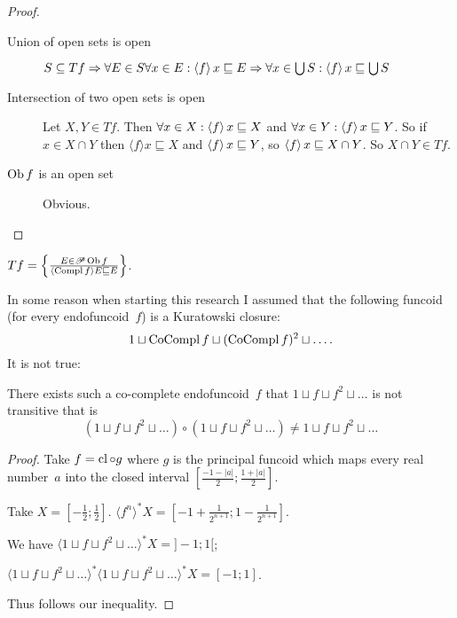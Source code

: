 \begin{proof}
  
  \begin{description}
    \item[Union of open sets is open] $S \subseteq T f \Rightarrow \forall E
    \in S \forall x \in E : \left\langle f\right\rangle x \sqsubseteq E \Rightarrow
    \forall x \in \bigcup S : \left\langle f\right\rangle x \sqsubseteq \bigcup S$
    
    \item[Intersection of two open sets is open] Let $X, Y \in T f$. Then
    $\forall x \in X : \left\langle f\right\rangle x \sqsubseteq X$ and $\forall x \in Y
    : \left\langle f\right\rangle x \sqsubseteq Y$. So if $x \in X \cap Y$ then $\langle
    f \rangle x \sqsubseteq X$ and $\left\langle f\right\rangle x \sqsubseteq Y$, so
    $\left\langle f\right\rangle x \sqsubseteq X \cap Y$. So $X \cap Y \in T f$.
    
    \item[$\operatorname{Ob} f$ is an open set] Obvious.
  \end{description}
\end{proof}

\begin{obvious}
$T f = \left\{ \frac{ E \in \mathscr{P} \operatorname{Ob} f }{ \langle
\operatorname{Compl} f \rangle E \sqsubseteq E }\right\}$.
\end{obvious}

In some reason when starting this research I assumed that the
following funcoid (for every endofuncoid~$f$) is a Kuratowski closure:
\[
1 \sqcup \operatorname{CoCompl} f \sqcup (\operatorname{CoCompl} f)^2 \sqcup \ldots.
\]
It is not true:

\begin{example}
There exists such a co-complete endofuncoid~$f$ that
$1 \sqcup f \sqcup f^2 \sqcup \ldots$ is not transitive that
is
\[(1 \sqcup f \sqcup f^2 \sqcup \ldots)\circ
(1 \sqcup f \sqcup f^2 \sqcup \ldots) \ne
1 \sqcup f \sqcup f^2 \sqcup \ldots
\]
\end{example}

\begin{proof}
Take $f=\operatorname{cl}\circ g$ where $g$ is the principal funcoid which maps
every real number~$a$ into the closed interval
$\left[ \frac{- 1 - | a |}{2} ; \frac{1 + | a |}{2} \right]$.

Take $X = \left[ - \frac{1}{2} ; \frac{1}{2} \right]$. $\langle f^n
\rangle^{\ast} X = \left[ - 1 + \frac{1}{2^{n + 1}} ; 1 - \frac{1}{2^{n + 1}}
\right]$.

We have $\langle 1 \sqcup f \sqcup f^2 \sqcup \ldots \rangle^{\ast} X =] - 1 ;
1 [$;

$\langle 1 \sqcup f \sqcup f^2 \sqcup \ldots \rangle^{\ast} \langle 1 \sqcup f
\sqcup f^2 \sqcup \ldots \rangle^{\ast} X = [- 1 ; 1]$.

Thus follows our inequality.
\end{proof}

